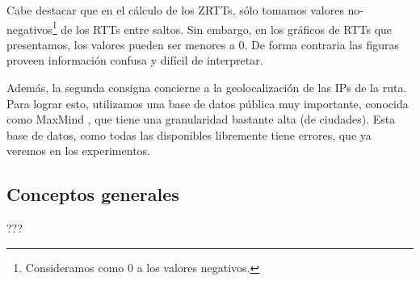 \par Cabe destacar que en el cálculo de los ZRTTs, sólo tomamos valores no-negativos\footnote{Consideramos como 0 a los valores negativos.} de los RTTs entre saltos. 
Sin embargo, en los gráficos de RTTs que presentamos, los valores pueden ser menores a 0.
De forma contraria las figuras proveen información confusa y difícil de interpretar.

Además, la segunda consigna concierne a la geolocalización de las IPs de la ruta. Para lograr esto, utilizamos una base de datos pública muy importante, conocida como MaxMind \cite{maxmind}, que tiene una granularidad bastante alta (de ciudades). Esta base de datos, como todas las disponibles libremente tiene errores, que ya veremos en los experimentos.



\subsection{Conceptos generales}
???
